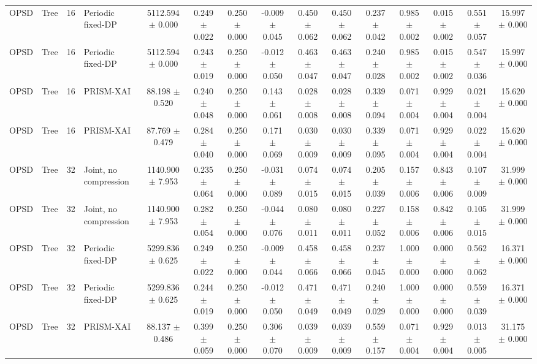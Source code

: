 \begin{tabular}{llllccccccccccc}
OPSD & Tree & 16 & Periodic fixed-DP & 5112.594 $\pm$ 0.000 & 0.249 $\pm$ 0.022 & 0.250 $\pm$ 0.000 & -0.009 $\pm$ 0.045 & 0.450 $\pm$ 0.062 & 0.450 $\pm$ 0.062 & 0.237 $\pm$ 0.042 & 0.985 $\pm$ 0.002 & 0.015 $\pm$ 0.002 & 0.551 $\pm$ 0.057 & 15.997 $\pm$ 0.000 \\
OPSD & Tree & 16 & Periodic fixed-DP & 5112.594 $\pm$ 0.000 & 0.243 $\pm$ 0.019 & 0.250 $\pm$ 0.000 & -0.012 $\pm$ 0.050 & 0.463 $\pm$ 0.047 & 0.463 $\pm$ 0.047 & 0.240 $\pm$ 0.028 & 0.985 $\pm$ 0.002 & 0.015 $\pm$ 0.002 & 0.547 $\pm$ 0.036 & 15.997 $\pm$ 0.000 \\
OPSD & Tree & 16 & PRISM-XAI & 88.198 $\pm$ 0.520 & 0.240 $\pm$ 0.048 & 0.250 $\pm$ 0.000 & 0.143 $\pm$ 0.061 & 0.028 $\pm$ 0.008 & 0.028 $\pm$ 0.008 & 0.339 $\pm$ 0.094 & 0.071 $\pm$ 0.004 & 0.929 $\pm$ 0.004 & 0.021 $\pm$ 0.004 & 15.620 $\pm$ 0.000 \\
OPSD & Tree & 16 & PRISM-XAI & 87.769 $\pm$ 0.479 & 0.284 $\pm$ 0.040 & 0.250 $\pm$ 0.000 & 0.171 $\pm$ 0.069 & 0.030 $\pm$ 0.009 & 0.030 $\pm$ 0.009 & 0.339 $\pm$ 0.095 & 0.071 $\pm$ 0.004 & 0.929 $\pm$ 0.004 & 0.022 $\pm$ 0.004 & 15.620 $\pm$ 0.000 \\
OPSD & Tree & 32 & Joint, no compression & 1140.900 $\pm$ 7.953 & 0.235 $\pm$ 0.064 & 0.250 $\pm$ 0.000 & -0.031 $\pm$ 0.089 & 0.074 $\pm$ 0.015 & 0.074 $\pm$ 0.015 & 0.205 $\pm$ 0.039 & 0.157 $\pm$ 0.006 & 0.843 $\pm$ 0.006 & 0.107 $\pm$ 0.009 & 31.999 $\pm$ 0.000 \\
OPSD & Tree & 32 & Joint, no compression & 1140.900 $\pm$ 7.953 & 0.282 $\pm$ 0.054 & 0.250 $\pm$ 0.000 & -0.044 $\pm$ 0.076 & 0.080 $\pm$ 0.011 & 0.080 $\pm$ 0.011 & 0.227 $\pm$ 0.052 & 0.158 $\pm$ 0.006 & 0.842 $\pm$ 0.006 & 0.105 $\pm$ 0.015 & 31.999 $\pm$ 0.000 \\
OPSD & Tree & 32 & Periodic fixed-DP & 5299.836 $\pm$ 0.625 & 0.249 $\pm$ 0.022 & 0.250 $\pm$ 0.000 & -0.009 $\pm$ 0.044 & 0.458 $\pm$ 0.066 & 0.458 $\pm$ 0.066 & 0.237 $\pm$ 0.045 & 1.000 $\pm$ 0.000 & 0.000 $\pm$ 0.000 & 0.562 $\pm$ 0.062 & 16.371 $\pm$ 0.000 \\
OPSD & Tree & 32 & Periodic fixed-DP & 5299.836 $\pm$ 0.625 & 0.244 $\pm$ 0.019 & 0.250 $\pm$ 0.000 & -0.012 $\pm$ 0.050 & 0.471 $\pm$ 0.049 & 0.471 $\pm$ 0.049 & 0.240 $\pm$ 0.029 & 1.000 $\pm$ 0.000 & 0.000 $\pm$ 0.000 & 0.559 $\pm$ 0.039 & 16.371 $\pm$ 0.000 \\
OPSD & Tree & 32 & PRISM-XAI & 88.137 $\pm$ 0.486 & 0.399 $\pm$ 0.059 & 0.250 $\pm$ 0.000 & 0.306 $\pm$ 0.070 & 0.039 $\pm$ 0.009 & 0.039 $\pm$ 0.009 & 0.559 $\pm$ 0.157 & 0.071 $\pm$ 0.004 & 0.929 $\pm$ 0.004 & 0.013 $\pm$ 0.005 & 31.175 $\pm$ 0.000 \\

\end{tabular}
